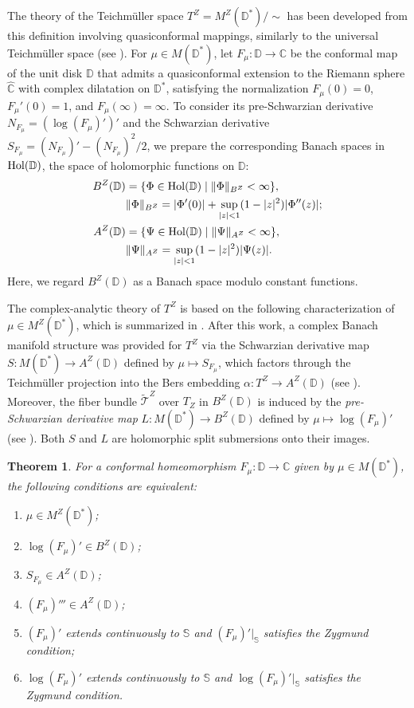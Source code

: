 \documentclass[amstex]{amsart}
\newtheorem{theorem}{Theorem}[section]
\theoremstyle{definition}
\theoremstyle{remark}
\numberwithin{equation}{section}
\begin{document}
The theory of the Teichm\"uller space $T^Z = M^Z(\mathbb D^*)/\sim$ has been developed
from this definition involving quasiconformal mappings, similarly to the universal Teichm\"uller space (see \cite[Chapter 3]{Le}).
For $\mu \in M(\mathbb D^*)$, let $F_\mu:\mathbb D \to \mathbb C$ be the conformal map of the unit disk
$\mathbb D$ that
admits a quasiconformal extension to the Riemann sphere $\widehat{\mathbb C}$ with complex dilatation on 
$\mathbb D^*$,
satisfying the normalization $F_\mu(0) = 0$, $F_\mu'(0) = 1$, and $F_\mu(\infty) = \infty$.
To consider its pre-Schwarzian derivative $N_{F_\mu}=(\log(F_\mu)')'$ and 
the Schwarzian derivative $S_{F_\mu}=(N_{F_\mu})'-(N_{F_\mu})^2/2$, 
we prepare the corresponding Banach spaces in ${\rm Hol}(\mathbb D)$, the space of holomorphic functions on $\mathbb D$:
\begin{align*}
B^Z(\mathbb D)& = \{\Phi \in {\rm Hol}(\mathbb D) \mid \Vert \Phi \Vert_{B^Z} < \infty\},\\
&\Vert \Phi \Vert_{B^Z} = |\Phi'(0)| + \sup_{|z|<1}(1 - |z|^2)|\Phi''(z)|;\\
A^Z(\mathbb D)&= \{\Psi \in {\rm Hol}(\mathbb D) \mid \Vert \Psi \Vert_{A^Z} < \infty\},\\
&\Vert \Psi \Vert_{A^Z} = \sup_{|z|<1}(1 - |z|^2)|\Psi(z)|.
\end{align*}
Here, we regard $B^Z(\mathbb D)$ as a Banach space modulo constant functions.

The complex-analytic theory of $T^Z$ is based on the following characterization of $\mu \in M^Z(\mathbb D^*)$,
which is summarized in \cite{TW1}. After this work, a complex Banach manifold structure was
provided for $T^Z$ via the Schwarzian derivative map $S:M(\mathbb D^*) \to A^Z(\mathbb D)$ 
defined by $\mu \mapsto S_{F_\mu}$, which factors through
the Teichm\"uller projection into
the Bers embedding $\alpha:T^Z \to A^Z(\mathbb D)$ (see \cite[Theorem 3]{M3}). Moreover,
the fiber bundle $\widetilde{\mathcal T}^Z$ over $T_Z$ in $B^Z(\mathbb D)$ is induced by
the {\it pre-Schwarzian derivative map} $L:M(\mathbb D^*) \to B^Z(\mathbb D)$
defined by $\mu \mapsto \log (F_\mu)'$ (see \cite[Theorem 2]{M4}).
Both $S$ and $L$ are holomorphic split submersions onto their images.

\begin{theorem}\label{equivalence}
For a conformal homeomorphism $F_\mu:\mathbb D \to \mathbb C$ given by $\mu \in M(\mathbb D^*)$,
the following conditions are equivalent:
\begin{enumerate}
\item
$\mu \in M^Z(\mathbb D^*)$;
\item
$\log (F_\mu)' \in B^Z(\mathbb D)$;
\item
$S_{F_\mu} \in A^Z(\mathbb D)$;
\item
$(F_\mu)''' \in A^Z(\mathbb D)$;
\item
$(F_\mu)'$ extends continuously to $\mathbb S$ and $(F_\mu)'|_{\mathbb S}$ 
satisfies the Zygmund condition;
\item
$\log (F_\mu)'$ extends continuously to $\mathbb S$ and $\log (F_\mu)'|_{\mathbb S}$ 
satisfies the Zygmund condition.
\end{enumerate}
\end{theorem}
\end{document}
